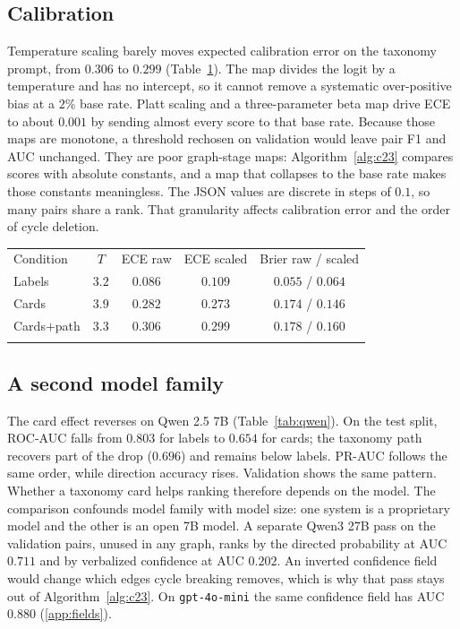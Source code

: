 \documentclass{ws-ijait}
\begin{document}
\subsection{Calibration}
\label{sec:cal}
Temperature scaling barely moves expected calibration error on the
taxonomy prompt, from $0.306$ to $0.299$ (Table~\ref{tab:cal}).
The map divides the logit by a temperature and has no intercept, so
it cannot remove a systematic over-positive bias at a $2$\% base
rate.
Platt scaling and a three-parameter beta map drive {ECE} to about
$0.001$ by sending almost every score to that base rate.
Because those maps are monotone, a threshold rechosen on validation
would leave pair {F1} and {AUC} unchanged.
They are poor graph-stage maps: Algorithm~\ref{alg:c23} compares
scores with absolute constants, and a map that collapses to the base
rate makes those constants meaningless.
The {JSON} values are discrete in steps of $0.1$, so many pairs
share a rank.
That granularity affects calibration error and the order of cycle
deletion.

\begin{table}[th]
{\begin{tabular}{@{}lcccc@{}}
\toprule
Condition & $T$ & {ECE} raw & {ECE} scaled & {Brier} raw / scaled \\
\colrule
Labels & $3.2$ & $\mathbf{0.086}$ & $0.109$ & $0.055$ / $0.064$ \\
Cards & $3.9$ & $0.282$ & $0.273$ & $0.174$ / $0.146$ \\
Cards$+$path & $3.3$ & $0.306$ & $0.299$ & $0.178$ / $0.160$ \\
\botrule
\end{tabular}}
\label{tab:cal}
\end{table}

\subsection{A second model family}
\label{sec:qwen}
The card effect reverses on {Qwen} 2.5 7B (Table~\ref{tab:qwen}).
On the test split, {ROC}-{AUC} falls from $0.803$ for labels to
$0.654$ for cards; the taxonomy path recovers part of the drop
($0.696$) and remains below labels.
{PR}-{AUC} follows the same order, while direction accuracy rises.
Validation shows the same pattern.
Whether a taxonomy card helps ranking therefore depends on the
model.
The comparison confounds model family with model size: one system
is a proprietary model and the other is an open 7B model.
A separate {Qwen}3 27B pass on the validation pairs, unused in any
graph, ranks by the directed probability at {AUC} $0.711$ and by
verbalized confidence at {AUC} $0.202$.
An inverted confidence field would change which edges cycle breaking
removes, which is why that pass stays out of Algorithm~\ref{alg:c23}.
On \texttt{gpt-4o-mini} the same confidence field has {AUC} $0.880$
(\ref{app:fields}).
\end{document}
